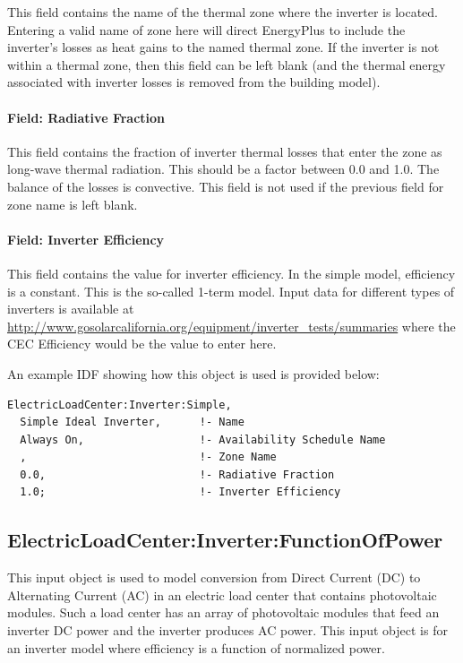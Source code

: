 This field contains the name of the thermal zone where the inverter is located. Entering a valid name of zone here will direct EnergyPlus to include the inverter's losses as heat gains to the named thermal zone. If the inverter is not within a thermal zone, then this field can be left blank (and the thermal energy associated with inverter losses is removed from the building model).

\paragraph{Field: Radiative Fraction}\label{field-radiative-fraction-1}

This field contains the fraction of inverter thermal losses that enter the zone as long-wave thermal radiation. This should be a factor between 0.0 and 1.0. The balance of the losses is convective. This field is not used if the previous field for zone name is left blank.

\paragraph{Field: Inverter Efficiency}\label{field-inverter-efficiency}

This field contains the value for inverter efficiency. In the simple model, efficiency is a constant. This is the so-called 1-term model. Input data for different types of inverters is available at \url{http://www.gosolarcalifornia.org/equipment/inverter_tests/summaries} where the CEC Efficiency would be the value to enter here.

An example IDF showing how this object is used is provided below:

\begin{lstlisting}
ElectricLoadCenter:Inverter:Simple,
  Simple Ideal Inverter,      !- Name
  Always On,                  !- Availability Schedule Name
  ,                           !- Zone Name
  0.0,                        !- Radiative Fraction
  1.0;                        !- Inverter Efficiency
\end{lstlisting}

\subsection{ElectricLoadCenter:Inverter:FunctionOfPower}\label{electricloadcenterinverterfunctionofpower}

This input object is used to model conversion from Direct Current (DC) to Alternating Current (AC) in an electric load center that contains photovoltaic modules. Such a load center has an array of photovoltaic modules that feed an inverter DC power and the inverter produces AC power. This input object is for an inverter model where efficiency is a function of normalized power.

